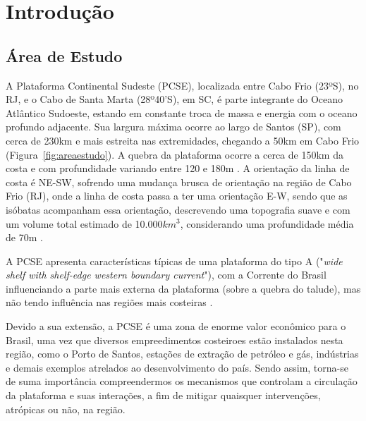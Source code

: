 \chapter{Introdução}

\section{Área de Estudo}
\label{sec:studyArea}

\hspace{5mm}A Plataforma Continental Sudeste (PCSE), localizada entre Cabo Frio (23ºS), no RJ, e o Cabo de Santa Marta (28º40'S), em SC, é parte integrante do Oceano Atlântico Sudoeste,
estando em constante troca de massa e energia com o oceano profundo adjacente. Sua largura máxima ocorre ao largo de Santos (SP), com cerca de 230km e mais estreita nas extremidades,
chegando a 50km em Cabo Frio (Figura~\ref{fig:areaestudo}). A quebra da plataforma ocorre a cerca de 150km da costa e com profundidade variando entre 120 e 180m \citep{zembruscki1979geomorfologia}. A orientação da linha de costa é NE-SW, sofrendo uma mudança brusca de orientação na região de Cabo Frio (RJ), onde a linha de costa passa a ter uma orientação E-W, sendo que as isóbatas acompanham essa orientação, descrevendo uma topografia suave e com um volume total estimado de 10.000$km^3$, considerando uma profundidade média de 70m \citep{castro1996correntes}.

\hspace{5mm} A PCSE apresenta características típicas de uma plataforma do tipo A ("\textit{wide shelf with shelf-edge western boundary current}"), com a Corrente do Brasil influenciando a parte mais externa da plataforma (sobre a quebra do talude), mas não tendo influência nas regiões mais costeiras \citep{castro2014summer,loder1998western}.

\hspace{5mm} Devido a sua extensão, a PCSE é uma zona de enorme valor econômico para o Brasil, uma vez que diversos empreedimentos costeiroes estão instalados nesta região, como o Porto de Santos, estações de extração de petróleo e gás, indústrias e demais exemplos atrelados ao desenvolvimento do país. Sendo assim, torna-se de suma importância compreendermos os mecanismos que controlam a circulação da plataforma e suas interações, a fim de mitigar quaisquer intervenções, atrópicas ou não, na região.

